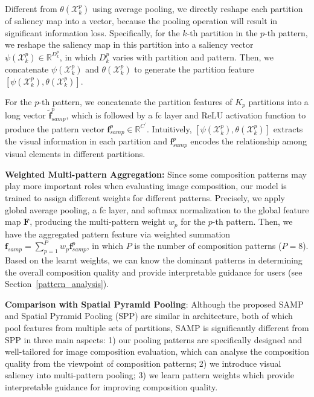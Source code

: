 \documentclass{bmvc2k}
\begin{document}
Different from $\theta(\mathcal{X}^p_k)$ using average pooling,  we directly reshape each partition of saliency map into a vector, because the pooling operation will result in significant information loss.
Specifically, for the $k$-th partition in the $p$-th pattern, we reshape the saliency map in this partition into a saliency vector $\psi(\mathcal{X}_k^p) \in \mathbb{R}^{D^{p}_k}$, in which $D^{p}_k$ varies with partition and pattern. Then, we concatenate $\psi(\mathcal{X}_k^p)$ and $\theta(\mathcal{X}^p_k)$ to generate the partition feature $[\psi{(\mathcal{X}^p_k)}, \theta(\mathcal{X}^p_k)]$. 

For the $p$-th pattern, we concatenate the partition features of $K_p$ partitions into a long vector $\tilde{\mathbf{f}}^p_{samp}$, which is followed by a fc layer and $\mathrm{ReLU}$ activation function to produce the pattern vector $\mathbf{f}^p_{samp} \in \mathbb{R}^{C^{\prime}}$.  \textcolor[rgb]{0,0,0}{Intuitively, $[\psi(\mathcal{X}_k^p),\theta(\mathcal{X}^p_k)]$ extracts the visual information in each partition and $\mathbf{f}^p_{samp}$  encodes the relationship among visual elements in different partitions.}

\noindent\textbf{Weighted Multi-pattern Aggregation:} 
Since some composition patterns may play more important roles when evaluating image composition, our model is trained to assign different weights for different patterns. Precisely, we apply global average pooling, a fc layer, and $\mathrm{softmax}$ normalization to the global feature map $\mathbf{F}$, producing the multi-pattern weight $w_p$ for the $p$-th pattern. Then, we have the aggregated pattern feature via weighted summation $\mathbf{f}_{samp} = \sum^P_{p=1} w_p \mathbf{f}^p_{samp}$, in which $P$ is the number of composition patterns ($P=8$). Based on the learnt weights, we can know the dominant patterns in determining the overall composition quality and provide interpretable guidance for users (see Section~\ref{pattern_analysis}).

\noindent\textbf{Comparison with Spatial Pyramid Pooling}: Although the proposed SAMP and Spatial Pyramid Pooling (SPP) \cite{He2015SpatialPP} are similar in architecture, both of which pool features from multiple sets of partitions, SAMP is significantly different from SPP in three main aspects: 1) our pooling patterns are specifically designed and well-tailored for image composition evaluation, which can analyse the composition quality from the viewpoint of composition patterns; 2) we introduce visual saliency into multi-pattern pooling; 3) we learn pattern weights which provide interpretable guidance for improving composition quality.
\end{document}

